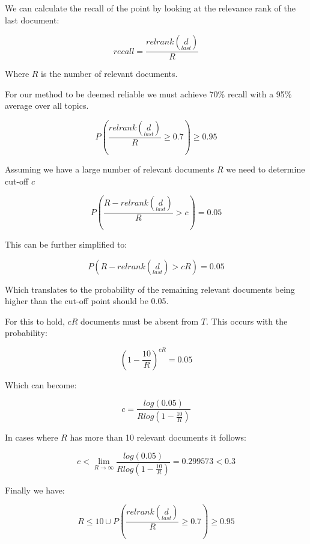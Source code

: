 We can calculate the recall of the point by looking at the relevance rank of the last document:

\begin{equation}
	  recall = \frac{relrank(\underset{last}{d})}{R}
\end{equation}

Where $R$ is the number of relevant documents.


For our method to be deemed reliable we must achieve 70\% recall with a 95\% average over all topics.

\begin{equation}
	  P(\frac{relrank(\underset{last}{d})}{R} \geqslant 0.7) \geqslant 0.95
\end{equation}


Assuming we have a large number of relevant documents $R$ we need to determine cut-off $c$

\begin{equation}
	  P( \frac{R - relrank(\underset{last}{d})}{R} > c) = 0.05
\end{equation}

This can be further simplified to:

\begin{equation}
	  P(R - relrank(\underset{last}{d}) > cR) = 0.05
\end{equation}

Which translates to the probability of the remaining relevant documents being higher than the cut-off point should be 0.05.

For this to hold, $cR$ documents must be absent from $T$. This occurs with the probability:


\begin{equation}
	  \left(1 - \frac{10}{R}\right)^{cR} = 0.05
\end{equation}

Which can become:

\begin{equation}
	  c = \frac{log(0.05)}{R log(1 - \frac{10}{R})}
\end{equation}


In cases where $R$ has more than 10 relevant documents it follows:


\begin{equation}
	  c < \lim_{R \to \infty} \frac{log(0.05)}{R log (1 - \frac{10}{R})} = 0.299573 < 0.3
\end{equation}

Finally we have:

\begin{equation}
	 R \leq 10 \cup P(\frac{relrank(\underset{last}{d})}{R} \geq 0.7) 	\geq 0.95
\end{equation}

